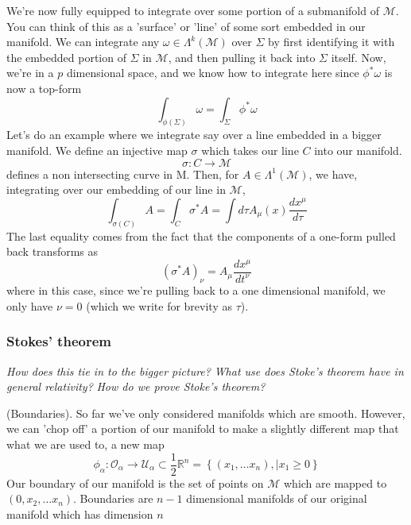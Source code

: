 We're now fully equipped to integrate over 
some portion of a submanifold of $ \mathcal{ M } $. 
You can think of this as a 'surface' or 'line' of 
some sort embedded in our manifold. 
We can integrate any $ \omega  \in \Lambda^ k ( \mathcal{ M } ) $ over  $\Sigma $ 
by first identifying it with the embedded portion of $ \Sigma $
in  $ \mathcal{ M } $, and then pulling it back into $\Sigma $
itself. Now, we're in a  $ p $ dimensional space, 
and we know how to integrate here since $ \phi ^ * \omega $ is 
now a top-form
\[
\int_{ \phi ( \Sigma ) } \omega = \int_{ \Sigma } \phi^ * \omega
\]  
Let's do an example where we integrate say over a line 
embedded in a bigger manifold. 
We define an injective map $ \sigma $ which 
takes our line $ C $ into our manifold. 
\[
\sigma : C\to \mathcal{ M }
\] defines a non intersecting curve in M. Then, for 
$ A \in \Lambda ^ 1 ( \mathcal{ M } ) $, we have, 
integrating over our embedding of our line in $\mathcal{ M } $, 
\[
\int_{ \sigma ( C) } A = \int_{ C } \sigma^ * A = \int d \tau A_{ \mu } ( x) \frac{ dx^ \mu }{d \tau }
\] 
The last equality comes from the fact that the 
components of a one-form pulled back transforms as
\[
 ( \sigma ^ * A )_\nu = A_\mu  \frac{ d x ^ \mu  }{ dt ^ \nu }
\] where in this case, since 
we're pulling back to a one dimensional 
manifold, we only have $ \nu = 0 $  (which we write
for brevity as $ \tau $). 

\subsubsection{Stokes' theorem}

\textit{How does this tie in to the bigger picture? }  
\textit{What use does Stoke's theorem have in general relativity?} 
\textit{How do we prove Stoke's theorem?} 


\begin{defn}{(Boundaries).} 
So far we've only considered manifolds which are smooth. 
However, we can 'chop off' a portion of 
our manifold to make a slightly different map that what we 
are used to, a new map 
\[
\phi_\alpha : \mathcal{ O }_\alpha \to \mathcal{ U }_\alpha \subset \frac{1}{2 } \mathbb{R}^n  = 
\left\{ (x_1, \dots x_ n ), \mid x_1 \geq 0  \right\} 
\] Our boundary of our manifold is the
set of points on $ \mathcal{ M }  $ which are mapped to 
$ ( 0 , x_2 , \dots x_ n ) $. 
Boundaries are $ n - 1 $ dimensional manifolds 
of our original manifold which has dimension $n$

\end{defn}

